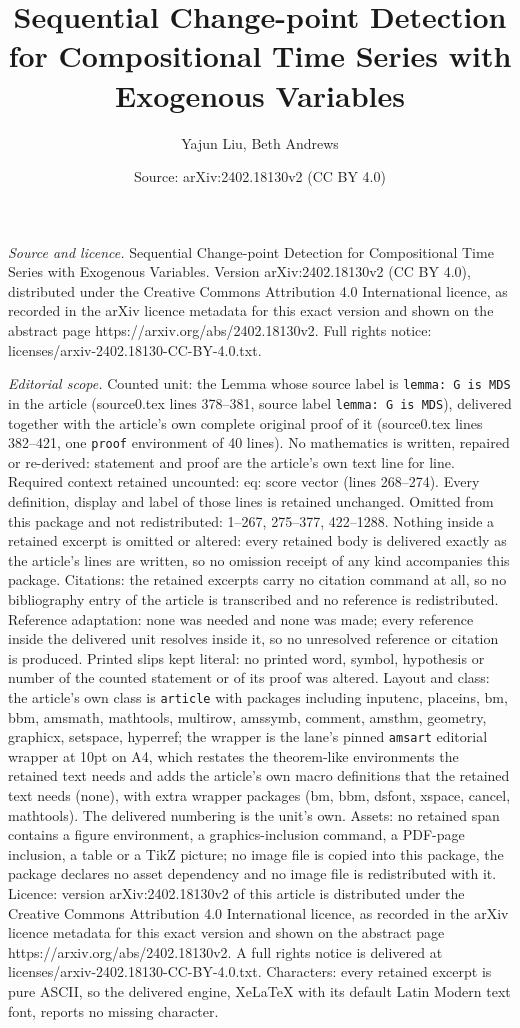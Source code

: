 \documentclass[10pt,a4paper]{amsart}
\title[Sequential Change-point Detection for Compositional Time Ser]{Sequential Change-point Detection for Compositional Time Series with Exogenous Variables}
\author{Yajun Liu, Beth Andrews}
\date{Source: arXiv:2402.18130v2 (CC BY 4.0)}
\begin{document}
\maketitle

\noindent\emph{Source and licence.} Sequential Change-point Detection for Compositional Time Series with Exogenous Variables. Version arXiv:2402.18130v2 (CC BY 4.0), distributed under the Creative Commons Attribution 4.0 International licence, as recorded in the arXiv licence metadata for this exact version and shown on the abstract page https://arxiv.org/abs/2402.18130v2. Full rights notice: licenses/arxiv-2402.18130-CC-BY-4.0.txt.\par\smallskip

\noindent\textit{Editorial scope.} Counted unit: the Lemma whose source label is \texttt{lemma: G is MDS} in the article (source0.tex lines 378--381, source label \texttt{lemma: G is MDS}), delivered together with the article's own complete original proof of it (source0.tex lines 382--421, one \texttt{proof} environment of 40 lines). No mathematics is written, repaired or re-derived: statement and proof are the article's own text line for line. Required context retained uncounted: eq: score vector (lines 268--274). Every definition, display and label of those lines is retained unchanged. Omitted from this package and not redistributed: 1--267, 275--377, 422--1288. Nothing inside a retained excerpt is omitted or altered: every retained body is delivered exactly as the article's lines are written, so no omission receipt of any kind accompanies this package. Citations: the retained excerpts carry no citation command at all, so no bibliography entry of the article is transcribed and no reference is redistributed. Reference adaptation: none was needed and none was made; every reference inside the delivered unit resolves inside it, so no unresolved reference or citation is produced. Printed slips kept literal: no printed word, symbol, hypothesis or number of the counted statement or of its proof was altered. Layout and class: the article's own class is \texttt{article} with packages including inputenc, placeins, bm, bbm, amsmath, mathtools, multirow, amssymb, comment, amsthm, geometry, graphicx, setspace, hyperref; the wrapper is the lane's pinned \texttt{amsart} editorial wrapper at 10pt on A4, which restates the theorem-like environments the retained text needs and adds the article's own macro definitions that the retained text needs (none), with extra wrapper packages (bm, bbm, dsfont, xspace, cancel, mathtools). The delivered numbering is the unit's own. Assets: no retained span contains a figure environment, a graphics-inclusion command, a PDF-page inclusion, a table or a TikZ picture; no image file is copied into this package, the package declares no asset dependency and no image file is redistributed with it. Licence: version arXiv:2402.18130v2 of this article is distributed under the Creative Commons Attribution 4.0 International licence, as recorded in the arXiv licence metadata for this exact version and shown on the abstract page https://arxiv.org/abs/2402.18130v2. A full rights notice is delivered at licenses/arxiv-2402.18130-CC-BY-4.0.txt. Characters: every retained excerpt is pure ASCII, so the delivered engine, XeLaTeX with its default Latin Modern text font, reports no missing character.
\end{document}
